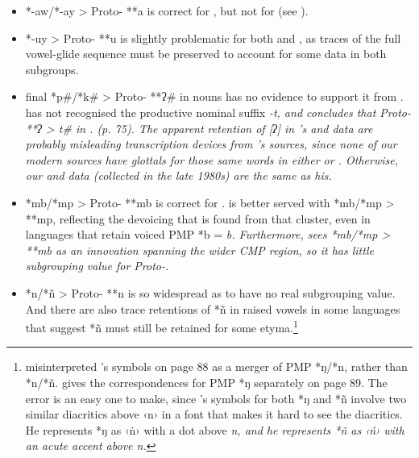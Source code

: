 \begin{itemize}
\item *-aw/*-ay > Proto- **a is correct for ,
but not for  (see ).

\item *-uy > Proto- **u is slightly problematic for both 
and , as traces of the full vowel-glide sequence
must be preserved to account for some data in both subgroups.

\item final *p{\#}/*k{\#} > Proto- **ʔ{\#} in nouns has no evidence
to support it from .
\citeauthor{Stresemann1927} has not recognised the productive nominal suffix \it{-t},
and concludes that Proto- **ʔ > \it{t}{\#} in . (p.
75). The apparent retention of [ʔ] in \citeauthor{Stresemann1927}’s 
and  data are probably misleading transcription devices
from \citeauthor{Stresemann1927}’s sources, since none of our modern sources have glottals for those same
words in either  or .
Otherwise, our  and  data (collected in the late
1980s) are the same as his.

\item *mb/*mp > Proto- **mb is correct for .
 is better served with *mb/*mp > **mp,
reflecting the devoicing that is found from that cluster,
even in languages that retain voiced PMP *b = \it{b}.
Furthermore, \citet[26]{Blust1981} sees *mb/*mp > **mb as an
innovation spanning the wider CMP region,
so it has little subgrouping value for Proto-.

\item *n/*ñ > Proto- **n is so widespread as to have no real subgrouping value.
And there are also trace retentions of *ñ in raised vowels in
some languages that suggest *ñ must still be retained for some
etyma.\footnote{
		\citet[12]{Collins1983} misinterpreted
		\citeauthor{Stresemann1927}'s \citeyear{Stresemann1927}
		symbols on page 88 as a merger of PMP *ŋ/*n, rather than *n/*ñ.
		\citeauthor{Stresemann1927} gives the correspondences for PMP *ŋ separately on page 89.
		The error is an easy one to make,
		since \citeauthor{Stresemann1927}'s symbols for both *ŋ
		and *ñ involve two similar diacritics above ‹n› in a font
		that makes it hard to see the diacritics.
		He represents *ŋ as ‹ṅ› with a dot above \it{n},
		and he represents *ñ as ‹ń› with an acute accent above \it{n}.}


\end{itemize}
